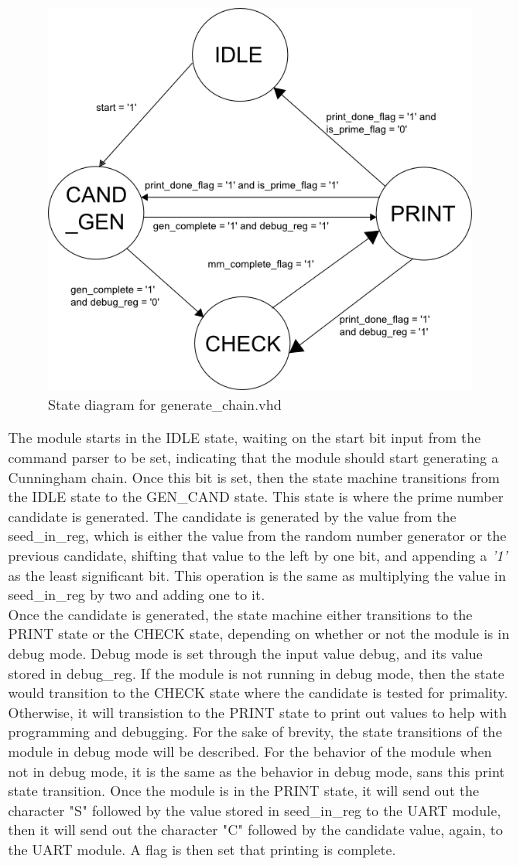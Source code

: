 \documentclass[journal]{IEEEtran}
\begin{document}
	\begin{figure}[h]
		\includegraphics[scale=0.5]{diagrams/gen_chain_state.png}
		\caption{State diagram for generate\_chain.vhd}
	\end{figure}
	
The module starts in the IDLE state, waiting on the start bit input from the command parser to be set, indicating that the module should start generating a Cunningham chain. Once this bit is set, then the state machine transitions from the IDLE state to the GEN\_CAND state. This state is where the prime number candidate is generated. The candidate is generated by the value from the seed\_in\_reg, which is either the value from the random number generator or the previous candidate, shifting that value to the left by one bit, and appending a \textit{'1'} as the least significant bit. This operation is the same as multiplying the value in seed\_in\_reg by two and adding one to it.\\

Once the candidate is generated, the state machine either transitions to the PRINT state or the CHECK state, depending on whether or not the module is in debug mode. Debug mode is set through the input value debug, and its value stored in debug\_reg. If the module is not running in debug mode, then the state would transition to the CHECK state where the candidate is tested for primality. Otherwise, it will transistion to the PRINT state to print out values to help with programming and debugging. For the sake of brevity, the state transitions of the module in debug mode will be described. For the behavior of the module when not in debug mode, it is the same as the behavior in debug mode, sans this print state transition. Once the module is in the PRINT state, it will send out the character "S" followed by the value stored in seed\_in\_reg to the UART module, then it will send out the character "C" followed by the candidate value, again, to the UART module. A flag is then set that printing is complete.\\
\end{document}
